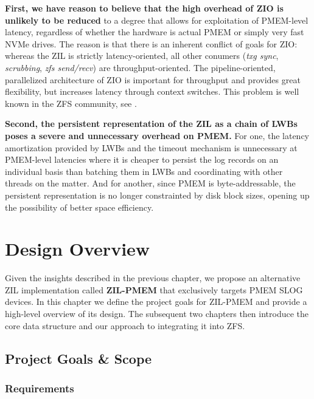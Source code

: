 \documentclass[12pt,a4paper,twoside]{book}
\begin{document}
\textbf{First, we have reason to believe that the high overhead of ZIO is unlikely to be reduced} to a degree that allows for exploitation of PMEM-level latency, regardless of whether the hardware is actual PMEM or simply very fast NVMe drives.
The reason is that there is an inherent conflict of goals for ZIO:
whereas the ZIL is strictly latency-oriented, all other conumers (\textit{txg sync}, \textit{scrubbing}, \textit{zfs send/recv}) are throughput-oriented.
The pipeline-oriented, parallelized architecture of ZIO is important for throughput and provides great flexibility, but increases latency through context switches.
This problem is well known in the ZFS community, see \cite{openzfsZILPerformanceImprovements2020}.

\textbf{Second, the persistent representation of the ZIL as a chain of LWBs poses a severe and unnecessary overhead on PMEM.}
For one, the latency amortization provided by LWBs and the timeout mechanism is unnecessary at PMEM-level latencies where it is cheaper to persist the log records on an individual basis than batching them in LWBs and coordinating with other threads on the matter.
And for another, since PMEM is byte-addressable, the persistent representation is no longer constrainted by disk block sizes, opening up the possibility of better space efficiency.

\chapter{Design Overview}\label{ch:designoverview}
Given the insights described in the previous chapter, we propose an alternative ZIL implementation called \textbf{ZIL-PMEM} that exclusively targets PMEM SLOG devices.
In this chapter we define the project goals for ZIL-PMEM and provide a high-level overview of its design.
The subsequent two chapters then introduce the core data structure and our approach to integrating it into ZFS.

\section{Project Goals \& Scope}

\newcommand{\csgoal}[1]{\textbf{#1}}

\subsection{Requirements}\label{sec:requirements}
\end{document}
